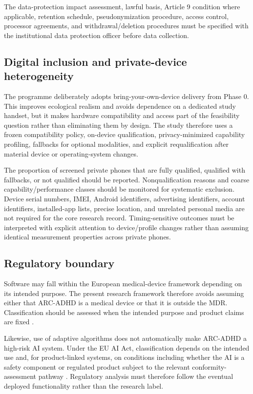 The data-protection impact assessment, lawful basis, Article 9 condition where applicable, retention schedule, pseudonymization procedure, access control, processor agreements, and withdrawal/deletion procedures must be specified with the institutional data protection officer before data collection.

\subsection{Digital inclusion and private-device heterogeneity}

The programme deliberately adopts bring-your-own-device delivery from Phase 0. This improves ecological realism and avoids dependence on a dedicated study handset, but it makes hardware compatibility and access part of the feasibility question rather than eliminating them by design. The study therefore uses a frozen compatibility policy, on-device qualification, privacy-minimized capability profiling, fallbacks for optional modalities, and explicit requalification after material device or operating-system changes.

The proportion of screened private phones that are fully qualified, qualified with fallbacks, or not qualified should be reported. Nonqualification reasons and coarse capability/performance classes should be monitored for systematic exclusion. Device serial numbers, IMEI, Android identifiers, advertising identifiers, account identifiers, installed-app lists, precise location, and unrelated personal media are not required for the core research record. Timing-sensitive outcomes must be interpreted with explicit attention to device/profile changes rather than assuming identical measurement properties across private phones.

\subsection{Regulatory boundary}

Software may fall within the European medical-device framework depending on its intended purpose. The present research framework therefore avoids assuming either that ARC-ADHD is a medical device or that it is outside the MDR. Classification should be assessed when the intended purpose and product claims are fixed \parencite{eu2017mdr}.

Likewise, use of adaptive algorithms does not automatically make ARC-ADHD a high-risk AI system. Under the EU AI Act, classification depends on the intended use and, for product-linked systems, on conditions including whether the AI is a safety component or regulated product subject to the relevant conformity-assessment pathway \parencite{eu2024aiact}. Regulatory analysis must therefore follow the eventual deployed functionality rather than the research label.

